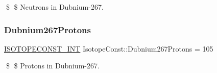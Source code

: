 \$ \$ Neutrons in Dubnium-\/267. \mbox{\label{group___isotope_const-_dubnium-_db267_gab789586740dce1b38aabec535700af3b}} 
\subsubsection{\texorpdfstring{Dubnium267\+Protons}{Dubnium267Protons}}
{\footnotesize\ttfamily \mbox{\hyperlink{group___isotope_const-_macros_ga5f18360b3e99483a35c32d789e62621c}{I\+S\+O\+T\+O\+P\+E\+C\+O\+N\+S\+T\+\_\+\+I\+NT}} Isotope\+Const\+::\+Dubnium267\+Protons = 105}

\$ \$ Protons in Dubnium-\/267. 